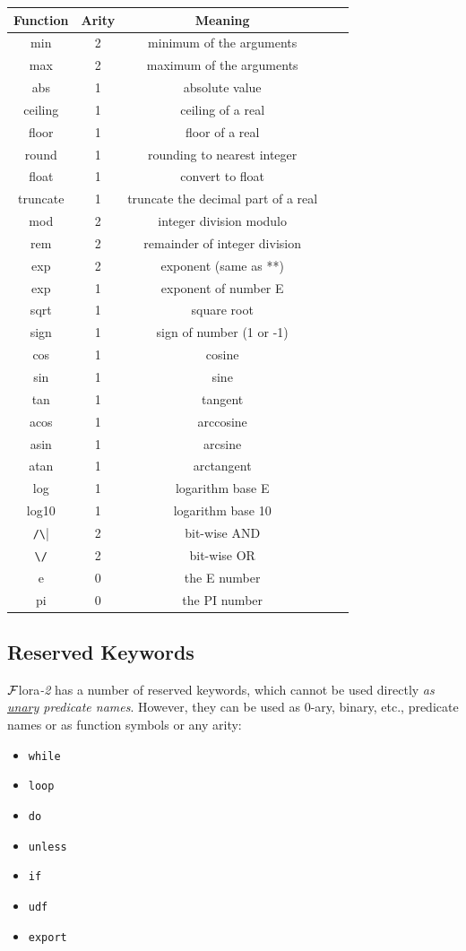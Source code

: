 \documentclass[11pt]{article}
\newcommand{\FLORA}{{\mbox{\sc ${\cal F}${lora}\rm\emph{-2}}}\xspace}
\begin{document}
\begin{tabular}{|c|c|c|c|c|}
\hline
Function  & Arity & Meaning  \\ \hline
min & 2 & minimum of the arguments\\
max & 2 & maximum of the arguments\\
abs & 1 & absolute value \\
ceiling & 1 & ceiling of a real \\
floor & 1 & floor of a real \\
round & 1 & rounding to nearest integer \\
float & 1 & convert to float \\
truncate & 1 & truncate the decimal part of a real \\
mod & 2 & integer division modulo \\
rem & 2 & remainder of integer division\\
exp & 2 & exponent (same as **)\\
exp & 1 & exponent of number E\\
sqrt & 1 & square root\\
sign & 1 & sign of number (1 or -1)\\
cos & 1 & cosine \\
sin & 1 & sine \\
tan & 1 & tangent \\
acos & 1 & arccosine\\ 
asin & 1 & arcsine\\ 
atan & 1 & arctangent\\ 
log & 1 & logarithm base E \\
log10 & 1 & logarithm base 10 \\
\verb|/\| & 2 & bit-wise AND \\
\verb|\/| & 2 & bit-wise OR \\
e & 0 & the E number\\
pi & 0 & the PI number\\
\hline
\end{tabular}

\subsection{Reserved Keywords}

\FLORA has a number of reserved keywords, which cannot be used directly \emph{as
\underline{unary} predicate names}. However, they can be used as 0-ary,
binary, etc., predicate names or as function symbols or any arity:
\begin{itemize}
\item  \texttt{while}
\item \texttt{loop}
\item \texttt{do}
\item \texttt{unless}
\item \texttt{if}
\item \texttt{udf}
\item \texttt{export}
\end{itemize}
\end{document}
